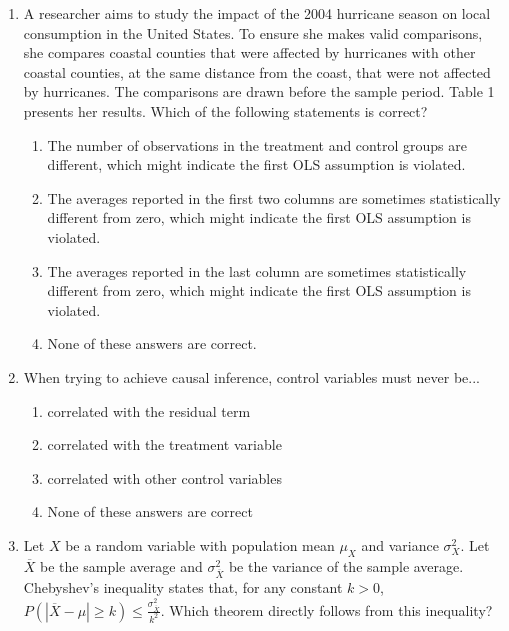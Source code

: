 \documentclass{article}
\begin{document}
\begin{enumerate}
\item A researcher aims to study the impact of the 2004 hurricane season on local consumption in the United States. To ensure she makes valid comparisons, she compares coastal counties that were affected by hurricanes with other coastal counties, at the same distance from the coast, that were not affected by hurricanes. The comparisons are drawn before the sample period. Table 1 presents her results. Which of the following statements is correct?

\begin{enumerate}[label=\alph*)]
\item The number of observations in the treatment and control groups are different, which might indicate the first OLS assumption is violated.
\item  The averages reported in the first two columns are sometimes statistically different from zero,  which might indicate the first OLS assumption is violated.
\item The averages reported in the last column are sometimes statistically different from zero,  which might indicate the first OLS assumption is violated.
\item None of these answers are correct.
\end{enumerate}\vspace{.25cm}


\item When trying to achieve causal inference, control variables must never be...

\begin{enumerate}[label=\alph*)]
\item correlated with the residual term
\item correlated with the treatment variable
\item correlated with other control variables
\item None of these answers are correct
\end{enumerate}\vspace{.25cm}

\newpage



\item Let $X$ be a random variable with population mean $\mu_X$ and variance $\sigma^2_{X}$. Let $\overline{X}$ be the sample average and $\sigma^2_{\overline{X}}$ be the variance of the sample average. Chebyshev’s inequality states that, for any constant $k>0$, $P\left( |\overline{X} - \mu| \geq k \right) \leq \frac{\sigma^2_{\overline{X}}}{k^2}$. Which theorem directly follows from this inequality?


\end{enumerate}
\end{document}
